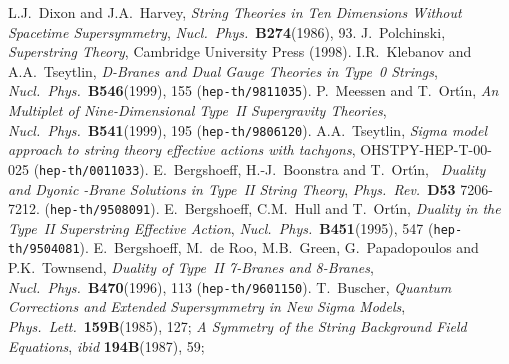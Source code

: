 \documentclass[12pt,a4paper]{article}
\begin{document}
\begin{thebibliography}{99}
%
 L.J.~Dixon and J.A.~Harvey,
                  {\sl String Theories in Ten Dimensions Without 
                  Spacetime Supersymmetry},
                  {\it Nucl.~Phys.}~{\bf B274}(1986), 93.
%
 J.~Polchinski,
                   {\sl Superstring Theory},
                   Cambridge University Press (1998).
%
 I.R.~Klebanov and A.A.~Tseytlin,
                  {\sl D-Branes and Dual Gauge Theories
                  in Type~0 Strings},
                  {\it Nucl.~Phys.}~{\bf B546}(1999), 155
                 ({\tt hep-th/9811035}).
%
%
 P.~Meessen and T.~Ort\'{\i}n,
                {\sl An \coordHE{} Multiplet of Nine-Dimensional 
                Type~II Supergravity Theories},
                {\it Nucl.~Phys.}~{\bf B541}(1999), 195
                ({\tt hep-th/9806120}).
%
 A.A.~Tseytlin,
                 {\sl Sigma model approach to string theory
                 effective actions with tachyons},
                 OHSTPY-HEP-T-00-025
                 ({\tt hep-th/0011033}).
%
 E.~Bergshoeff, H.-J.~Boonstra and T.~Ort\'{\i}n,
                 {\sl {}\coordHE{}~Duality and Dyonic \coordHE{}-Brane Solutions
                 in Type~II String Theory},
                 {\it Phys.~Rev.}~{\bf D53} 7206-7212.
                 ({\tt hep-th/9508091}).
%
 E.~Bergshoeff, C.M.~Hull and T.~Ort\'{\i}n,
                 {\sl Duality in the Type~II Superstring Effective
                  Action},
                 {\it Nucl.~Phys.}~{\bf B451}(1995), 547
                 ({\tt hep-th/9504081}).
%
 E.~Bergshoeff, M.~de Roo, M.B.~Green,
                   G.~Papadopoulos and P.K.~Townsend,
                 {\sl Duality of Type~II 7-Branes and 8-Branes},
                   {\it Nucl.~Phys.}~{\bf B470}(1996), 113
                  ({\tt hep-th/9601150}).
%
 T.~Buscher,
         {\sl Quantum Corrections and Extended Supersymmetry
                in New Sigma Models},
                {\it Phys.~Lett.}~{\bf 159B}(1985), 127;
                {\sl A Symmetry of the String Background Field
                Equations},
                {\it ibid} {\bf 194B}(1987), 59;

\end{thebibliography}
\end{document}
